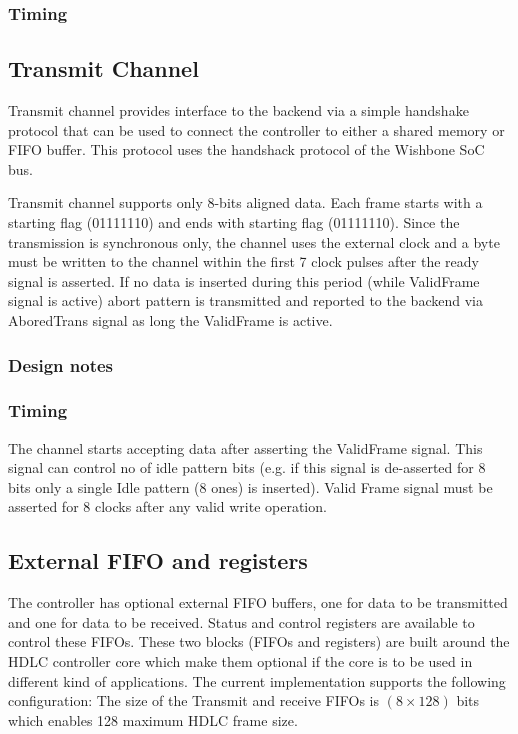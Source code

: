 \documentclass[a4paper,11pt]{article}
\begin{document}
\subsubsection{Timing}


\subsection{Transmit Channel}
Transmit channel provides interface to the backend via a simple handshake protocol that can be used to connect the controller to either a shared memory or FIFO buffer. This protocol uses the handshack protocol of the Wishbone SoC bus.

Transmit channel supports only 8-bits aligned data. Each frame starts with a starting flag (01111110) and ends with starting flag (01111110). Since the transmission is synchronous only, the channel uses the external clock and a byte must be written to the channel within the first 7 clock pulses after the ready signal is asserted. If no data is inserted during this period (while ValidFrame signal is active) abort pattern is transmitted and reported to the backend via AboredTrans signal as long the ValidFrame is active.


\subsubsection{Design notes}

\subsubsection{Timing}
The channel starts accepting data after asserting the ValidFrame signal. This signal can control no of idle pattern bits (e.g. if this signal is de-asserted for 8 bits only a single Idle pattern (8 ones) is inserted). Valid Frame signal must be asserted for 8 clocks after any valid write operation.

\subsection{External FIFO and registers}
The controller has optional external FIFO buffers, one for data to be transmitted and one for data to be received. Status and control registers are available to control these FIFOs. These two blocks (FIFOs and registers) are built around the HDLC controller core which make them optional if the core is to be used in different kind of applications.
The current implementation supports the following configuration: 
The size of the Transmit and receive FIFOs is $(8\times 128)$ bits which enables 128 maximum HDLC frame size.
\end{document}
